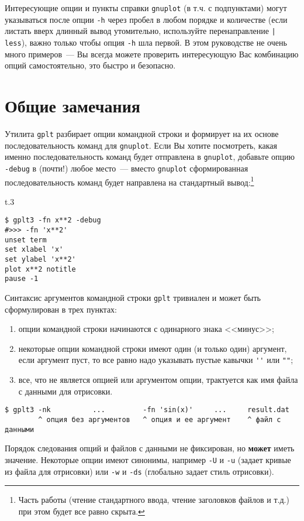 \documentclass[12pt]{article}
\def\gplt{{\tt gplt}}
\def\gnuplot{{\tt gnuplot}}
\begin{document}
Интересующие опции и пункты справки \gnuplot{} (в т.ч. с подпунктами) могут указываться после опции \verb'-h' через пробел в любом порядке и количестве
(если листать вверх длинный вывод утомительно, используйте перенаправление \verb'| less'), важно только чтобы опция \verb'-h' шла первой.
В этом руководстве не очень много примеров~--- Вы всегда можете проверить интересующую Вас комбинацию опций самостоятельно, это быстро и безопасно. 
\pagebreak

\section{Общие замечания}
Утилита \gplt{} разбирает опции командной строки и формирует на их основе последовательность команд для \gnuplot. Если Вы хотите посмотреть,
какая именно последовательность команд будет отправлена в \gnuplot, добавьте опцию \verb'-debug' в (почти!) любое место~--- вместо \gnuplot{}
сформированная последовательность команд будет направлена на стандартный вывод:\footnote{Часть работы
  (чтение стандартного ввода, чтение заголовков файлов и т.д.) при этом будет все равно скрыта.}
\begin{wrapfigure}[1]{t}{.3\textwidth}
  \vphantom{.}
  \vspace{-1.3cm}

\end{wrapfigure}
\begin{verbatim}
$ gplt3 -fn x**2 -debug
#>>> -fn 'x**2'
unset term
set xlabel 'x'
set ylabel 'x**2'
plot x**2 notitle   
pause -1
\end{verbatim}

Синтаксис аргументов командной строки \gplt{} тривиален и может быть сформулирован в трех пунктах:
\begin{enumerate}
\item опции командной строки начинаются с одинарного знака <<минус>>;
\item некоторые опции командной строки имеют один (и только один) аргумент, если аргумент пуст, то все равно надо указывать пустые кавычки \verb|''| или \verb|""|;
\item все, что не является опцией или аргументом опции, трактуется как имя файла с данными для отрисовки.
\end{enumerate}
\begin{verbatim}
$ gplt3 -nk          ...         -fn 'sin(x)'     ...     result.dat
        ^ опция без аргументов   ^ опция и ее аргумент    ^ файл с данными
\end{verbatim}
Порядок следования опций и файлов с данными не фиксирован, но {\bf может} иметь значение.  Некоторые опции имеют синонимы, например \verb'-U' и \verb'-u'
(задает кривые из файла для отрисовки) или \verb'-w' и \verb'-ds' (глобально задает стиль отрисовки).
\end{document}
